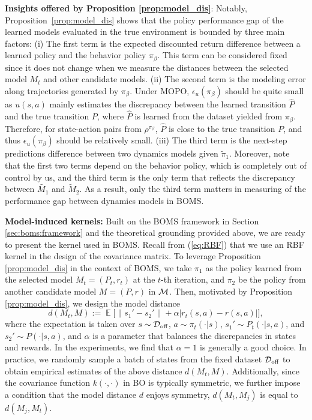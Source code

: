 \noindent\textbf{Insights offered by Proposition \ref{prop:model_dis}}: Notably, Proposition~\ref{prop:model_dis} shows that the policy performance gap of the learned models evaluated in the true environment is bounded by three main factors: 
(i) The first term is the expected discounted return difference between a learned policy and the behavior policy $\pi_\beta$. This term can be considered fixed since it does not change when we measure the distances between the selected model ${M}_t$ and other candidate models.
(ii) The second term is the modeling error along trajectories generated by $\pi_\beta$. Under MOPO, $\epsilon_u(\pi_\beta)$ should be quite small as $u(s,a)$ mainly estimates the discrepancy between the learned transition $\hat{P}$ and the true transition ${P}$, where $\hat{P}$ is learned from the dataset yielded from $\pi_\beta$. Therefore, for state-action pairs from $\rho^{\pi_\beta}$, $\hat{P}$ is close to the true transition ${P}$, and thus $\epsilon_u(\pi_\beta)$ should be relatively small. 
(iii) The third term is the next-step predictions difference between two dynamics models given $\widetilde{\pi}_1$. 
Moreover, note that the first two terms depend on the behavior policy, which is completely out of control by us, and the third term is the only term that reflects the discrepancy between $\widetilde{M_1}$ and $\widetilde{M}_2$. As a result, only the third term matters in measuring of the performance gap between dynamics models in BOMS.

\noindent\textbf{Model-induced kernels:} Built on the BOMS framework in Section \ref{sec:boms:framework} and the theoretical grounding provided above, we are ready to present the kernel used in BOMS. Recall from (\ref{eq:RBF}) that we use an RBF kernel in the design of the covariance matrix. To leverage Proposition \ref{prop:model_dis} in the context of BOMS, we take ${\pi}_1$ as the policy learned from the selected model $M_t=(P_t,r_t)$ at the $t$-th iteration, and ${\pi}_2$ be the policy from another candidate model $M=(P,r)$ in $\operatorname{\mathcal{M}}$. Then, motivated by Proposition \ref{prop:model_dis}, we design the model distance
\begin{equation}
    d(M_t, M):= \displaystyle\mathop{\mathbb{E}}\bigg[\lVert s_1'-s_2'\rVert+\alpha \big\lvert r_t(s,a)-r(s,a)\big\rvert\bigg],\label{eq:distance}
\end{equation} 
where the expectation is taken over $s\sim \operatorname{\mathcal{D}}_{\text{off}}$, $a \sim \pi_t(\cdot\rvert s)$, $s_1'\sim P_t(\cdot\rvert s,a)$, and $s_2'\sim P(\cdot\rvert s,a)$, and $\alpha$ is a parameter that balances the discrepancies in states and rewards. In the experiments, we find that $\alpha=1$ is generally a good choice.
In practice, we randomly sample a batch of states from the fixed dataset $\operatorname{\mathcal{D}}_{\text{off}}$ to obtain empirical estimates of the above distance $d(M_t, M)$. Additionally, since the covariance function $k(\cdot,\cdot)$ in BO is typically symmetric, we further impose a condition that the model distance $d$ enjoys symmetry, \ie ${d(M_t, M_j)}$ is equal to ${d(M_j, M_t)}$.

